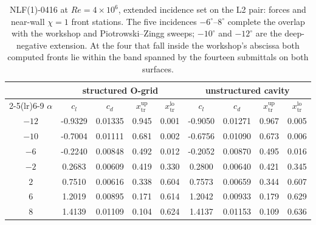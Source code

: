 \begin{table}[tp]
  \centering\small
  \caption{NLF(1)-0416 at $Re\!=\!4\!\times\!10^6$, extended incidence set on the L2 pair: forces and near-wall $\chi\!=\!1$ front stations. The five incidences $-6^\circ$--$8^\circ$ complete the overlap with the workshop and Piotrowski--Zingg sweeps; $-10^\circ$ and $-12^\circ$ are the deep-negative extension. At the four that fall inside the workshop's abscissa both computed fronts lie within the band spanned by the fourteen submittals on both surfaces.}
  \label{tab:extnlfalpha}
  \begin{tabular}{c cccc cccc}
    \toprule
    & \multicolumn{4}{c}{structured O-grid} & \multicolumn{4}{c}{unstructured cavity} \\
    \cmidrule(lr){2-5}\cmidrule(lr){6-9}
    $\alpha$ & $c_l$ & $c_d$ & $x_\mathrm{tr}^\mathrm{up}$ & $x_\mathrm{tr}^\mathrm{lo}$
             & $c_l$ & $c_d$ & $x_\mathrm{tr}^\mathrm{up}$ & $x_\mathrm{tr}^\mathrm{lo}$ \\
    \midrule
    $-12$ & -0.9329 & 0.01335 & 0.945 & 0.001 & -0.9050 & 0.01271 & 0.967 & 0.005 \\
    $-10$ & -0.7004 & 0.01111 & 0.681 & 0.002 & -0.6756 & 0.01090 & 0.673 & 0.006 \\
    $-6$ & -0.2240 & 0.00848 & 0.492 & 0.012 & -0.2052 & 0.00870 & 0.495 & 0.016 \\
    $-2$ & 0.2683 & 0.00609 & 0.419 & 0.330 & 0.2800 & 0.00640 & 0.421 & 0.345 \\
    $2$ & 0.7510 & 0.00616 & 0.338 & 0.604 & 0.7573 & 0.00659 & 0.344 & 0.607 \\
    $6$ & 1.2019 & 0.00895 & 0.171 & 0.614 & 1.2042 & 0.00933 & 0.179 & 0.629 \\
    $8$ & 1.4139 & 0.01109 & 0.104 & 0.624 & 1.4137 & 0.01153 & 0.109 & 0.636 \\
    \bottomrule
  \end{tabular}
\end{table}
